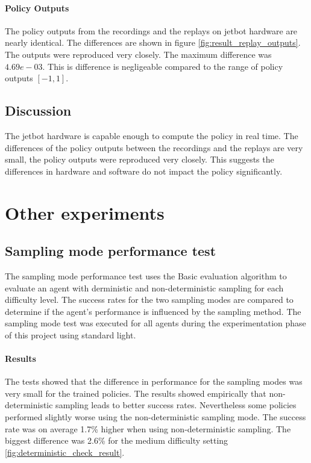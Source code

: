 
\paragraph{Policy Outputs}

The policy outputs from the recordings and the replays on jetbot hardware are nearly identical. The differences are shown in figure \ref{fig:result_replay_outputs}. The outputs were reproduced very closely. The maximum difference was $4.69e-03$.  This is difference is negligeable compared to the range of policy outputs $[-1,1]$.


\subsection{Discussion}

The jetbot hardware is capable enough to compute the policy in real time. The differences of the policy outputs between the recordings and the replays are very small, the policy outputs were reproduced very closely. This suggests the differences in hardware and software do not impact the policy significantly.

\section{Other experiments}

\subsection{Sampling mode performance test}
\label{ref:sampling_mode_test_results}

The sampling mode performance test uses the Basic evaluation algorithm to evaluate an agent with derministic and non-deterministic sampling for each difficulty level. The success rates for the two sampling modes are compared to determine if the agent's performance is influenced by the sampling method. The sampling mode test was executed for all agents during the experimentation phase of this project using standard light.

\paragraph{Results}
The tests showed that the difference in performance for the sampling modes was very small for the trained policies. The results showed empirically that non-deterministic sampling leads to better success rates. Nevertheless some policies performed slightly worse using the non-deterministic sampling mode. The success rate was on average 1.7\% higher when using non-deterministic sampling. The biggest difference was 2.6\% for the medium difficulty setting \ref{fig:deterministic_check_result}.

